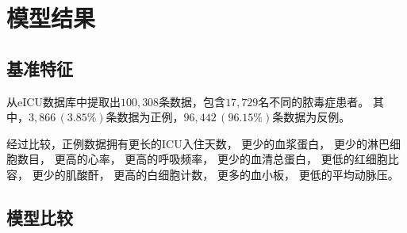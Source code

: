 \section{模型结果}

\NewDocumentCommand{}

\subsection{基准特征}

从eICU数据库中提取出$100,308$条数据，包含$17,729$名不同的脓毒症患者。%
其中，$3,866\,(3.85\%)$条数据为正例，$96,442\,(96.15\%)$条数据为反例。

经过比较，正例数据拥有更长的ICU入住天数，%
更少的血浆蛋白，%
更少的淋巴细胞数目，%
更高的心率，%
更高的呼吸频率，%
更少的血清总蛋白，%
更低的红细胞比容，%
更少的肌酸酐，%
更高的白细胞计数，%
更多的血小板，%
更低的平均动脉压。

\subsection{模型比较}

